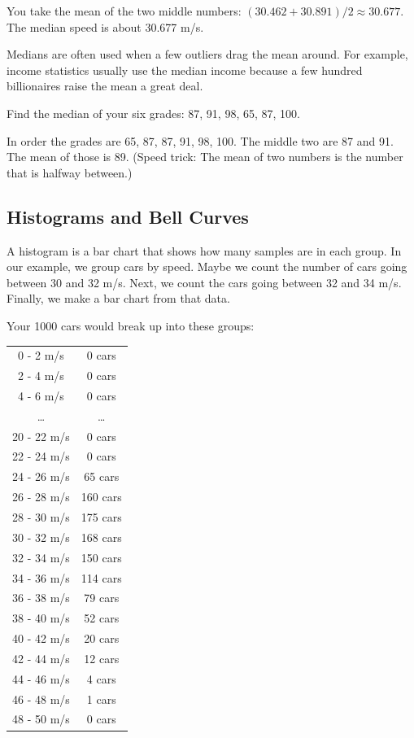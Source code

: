 You take the mean of the two middle numbers: $(30.462 + 30.891)/2 \approx
30.677$. The median speed is about 30.677 m/s.

Medians are often used when a few outliers drag the
mean around. For example, income statistics usually use the median income
because a few hundred billionaires raise the mean a great deal.

\begin{Exercise}[title={Median Grade}, label=grades_median]

  Find the median of your six grades: 87, 91, 98, 65, 87, 100.

\end{Exercise}
\begin{Answer}[ref=grades_median]

  In order the grades are 65, 87, 87, 91, 98, 100.  The middle two are 87
  and 91. The mean of those is 89. (Speed trick: The mean of two numbers is the
  number that is halfway between.)
  
 \end{Answer}


\subsection{Histograms and Bell Curves}

A histogram is a bar chart that shows how many samples are in each
group. In our example, we group cars by speed. Maybe we count the
number of cars going between 30 and 32 m/s. Next, we count the
cars going between 32 and 34 m/s. Finally, we make a bar chart from
that data.


Your 1000 cars would break up into these groups:

\begin{tabular}{ c | c }
0 - 2 m/s & 0 cars \\
2 - 4 m/s & 0 cars \\
4 - 6 m/s & 0 cars \\
\ldots & \ldots \\
20 - 22 m/s & 0 cars \\
22 - 24 m/s & 0 cars \\
24 - 26 m/s & 65 cars \\
26 - 28 m/s & 160 cars \\
28 - 30 m/s & 175 cars \\
30 - 32 m/s & 168 cars \\
32 - 34 m/s & 150 cars \\
34 - 36 m/s & 114 cars \\
36 - 38 m/s & 79 cars \\
38 - 40 m/s & 52 cars \\
40 - 42 m/s & 20 cars \\
42 - 44 m/s & 12 cars \\
44 - 46 m/s & 4 cars \\
46 - 48 m/s & 1 cars \\
48 - 50 m/s & 0 cars \\
\end{tabular}


